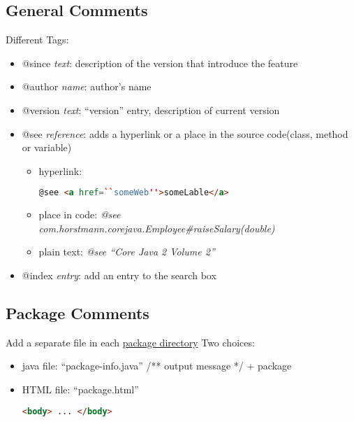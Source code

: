 \documentclass[12pt]{article}
\begin{document}
\subsection{General Comments}
Different Tags:
\begin{itemize}
    \item @since \emph{text}: description of the version that introduce the feature
    \item @author \emph{name}: author's name
    \item @version \emph{text}: ``version'' entry, description of current version
    \item @see \emph{reference}: adds a hyperlink or a place in the source code(class, method or variable)
    \begin{itemize}
        \item hyperlink:
        \begin{lstlisting}[language=html]
        @see <a href=``someWeb''>someLable</a>
        \end{lstlisting}     
        \item place in code:\newline
        \textit{@see com.horstmann.corejava.Employee\#raiseSalary(double)}
        \item plain text:
        \textit{@see ``Core Java 2 Volume 2''}
    \end{itemize}
    \item @index \emph{entry}: add an entry to the search box
\end{itemize}

\subsection{Package Comments}
Add a separate file in each \underline{package directory}
Two choices:
\begin{itemize}
    \item java file: ``package-info.java'' \newline
    /** output message */ + package
    \item HTML file: ``package.html'' 
    \begin{lstlisting}[language=html]
    <body> ... </body>
    \end{lstlisting}        
\end{itemize}
\end{document}
